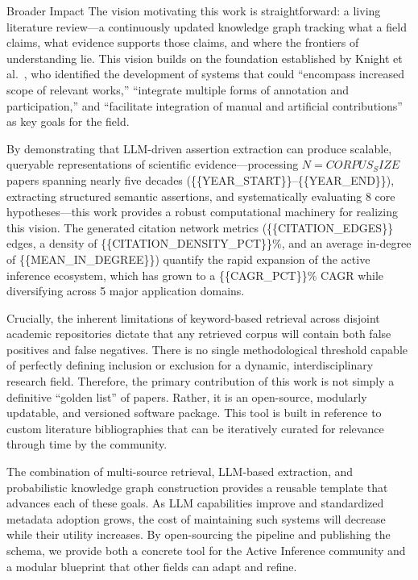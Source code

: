\documentclass[
  ignorenonframetext,
]{beamer}
\begin{document}
\begin{frame}{Broader Impact}
\protect{}\label{broader-impact}
The vision motivating this work is straightforward: a living literature
review---a continuously updated knowledge graph tracking what a field
claims, what evidence supports those claims, and where the frontiers of
understanding lie. This vision builds on the foundation established by
Knight et al.~\citep{knight2022fep}, who identified the development of
systems that could ``encompass increased scope of relevant works,''
``integrate multiple forms of annotation and participation,'' and
``facilitate integration of manual and artificial contributions'' as key
goals for the field.

By demonstrating that LLM-driven assertion extraction can produce
scalable, queryable representations of scientific evidence---processing
\(N = {{CORPUS_SIZE}}\) papers spanning nearly five decades
(\{\{YEAR\_START\}\}--\{\{YEAR\_END\}\}), extracting structured semantic
assertions, and systematically evaluating 8 core hypotheses---this work
provides a robust computational machinery for realizing this vision. The
generated citation network metrics (\{\{CITATION\_EDGES\}\} edges, a
density of \{\{CITATION\_DENSITY\_PCT\}\}\%, and an average in-degree of
\{\{MEAN\_IN\_DEGREE\}\}) quantify the rapid expansion of the active
inference ecosystem, which has grown to a \{\{CAGR\_PCT\}\}\% CAGR while
diversifying across 5 major application domains.

Crucially, the inherent limitations of keyword-based retrieval across
disjoint academic repositories dictate that any retrieved corpus will
contain both false positives and false negatives. There is no single
methodological threshold capable of perfectly defining inclusion or
exclusion for a dynamic, interdisciplinary research field. Therefore,
the primary contribution of this work is not simply a definitive
``golden list'' of papers. Rather, it is an open-source, modularly
updatable, and versioned software package. This tool is built in
reference to custom literature bibliographies that can be iteratively
curated for relevance through time by the community.

The combination of multi-source retrieval, LLM-based extraction, and
probabilistic knowledge graph construction provides a reusable template
that advances each of these goals. As LLM capabilities improve and
standardized metadata adoption grows, the cost of maintaining such
systems will decrease while their utility increases. By open-sourcing
the pipeline and publishing the schema, we provide both a concrete tool
for the Active Inference community and a modular blueprint that other
fields can adapt and refine.


\end{frame}
\end{document}
